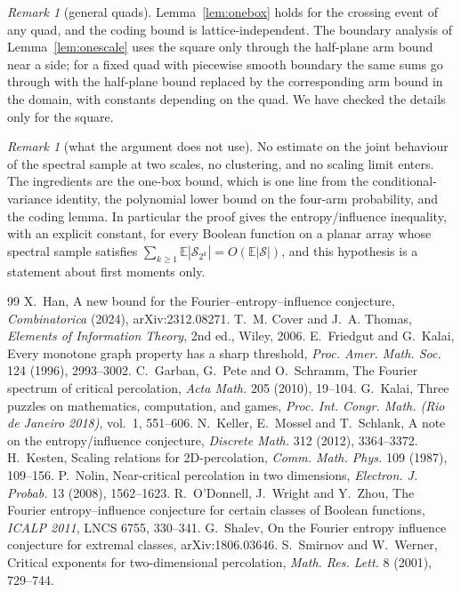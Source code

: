 \documentclass[11pt]{amsart}
\theoremstyle{remark}
\newtheorem{remark}[theorem]{Remark}
\newcommand{\EE}{\mathbb{E}}
\newcommand{\Sc}{\mathcal{S}}
\begin{document}
\begin{remark}[general quads]
Lemma~\ref{lem:onebox} holds for the crossing event of any quad, and the coding bound is lattice-independent. The boundary analysis of Lemma~\ref{lem:onescale} uses the square only through the half-plane arm bound near a side; for a fixed quad with piecewise smooth boundary the same sums go through with the half-plane bound replaced by the corresponding arm bound in the domain, with constants depending on the quad. We have checked the details only for the square.
\end{remark}

\begin{remark}[what the argument does not use]
No estimate on the joint behaviour of the spectral sample at two scales, no clustering, and no scaling limit enters. The ingredients are the one-box bound, which is one line from the conditional-variance identity, the polynomial lower bound on the four-arm probability, and the coding lemma. In particular the proof gives the entropy/influence inequality, with an explicit constant, for every Boolean function on a planar array whose spectral sample satisfies $\sum_{k\ge1}\EE|\Sc_{2^k}|=O(\EE|\Sc|)$, and this hypothesis is a statement about first moments only.
\end{remark}

\begin{thebibliography}{99}
 X.~Han, A new bound for the Fourier--entropy--influence conjecture, \emph{Combinatorica} (2024), arXiv:2312.08271.
 T.~M. Cover and J.~A. Thomas, \emph{Elements of Information Theory}, 2nd ed., Wiley, 2006.
 E.~Friedgut and G.~Kalai, Every monotone graph property has a sharp threshold, \emph{Proc. Amer. Math. Soc.} 124 (1996), 2993--3002.
 C.~Garban, G.~Pete and O.~Schramm, The Fourier spectrum of critical percolation, \emph{Acta Math.} 205 (2010), 19--104.
 G.~Kalai, Three puzzles on mathematics, computation, and games, \emph{Proc. Int. Congr. Math. (Rio de Janeiro 2018)}, vol.~1, 551--606.
 N.~Keller, E.~Mossel and T.~Schlank, A note on the entropy/influence conjecture, \emph{Discrete Math.} 312 (2012), 3364--3372.
 H.~Kesten, Scaling relations for 2D-percolation, \emph{Comm. Math. Phys.} 109 (1987), 109--156.
 P.~Nolin, Near-critical percolation in two dimensions, \emph{Electron. J. Probab.} 13 (2008), 1562--1623.
 R.~O'Donnell, J.~Wright and Y.~Zhou, The Fourier entropy--influence conjecture for certain classes of Boolean functions, \emph{ICALP 2011}, LNCS 6755, 330--341.
 G.~Shalev, On the Fourier entropy influence conjecture for extremal classes, arXiv:1806.03646.
 S.~Smirnov and W.~Werner, Critical exponents for two-dimensional percolation, \emph{Math. Res. Lett.} 8 (2001), 729--744.
\end{thebibliography}
\end{document}
